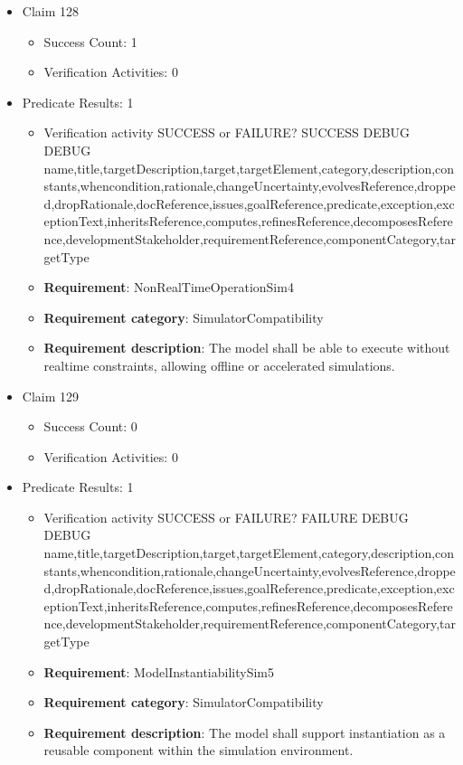 \documentclass{article}
\begin{document}
\begin{itemize}
  				  \item Claim 128
				\begin{itemize}
			    	\item Success Count: 1 
			    	\item Verification Activities: 0
				\end{itemize}
				
									    
				\item Predicate Results: 1
					\begin{itemize}				
					\item Verification activity SUCCESS or FAILURE? SUCCESS
					DEBUG DEBUG name,title,targetDescription,target,targetElement,category,description,constants,whencondition,rationale,changeUncertainty,evolvesReference,dropped,dropRationale,docReference,issues,goalReference,predicate,exception,exceptionText,inheritsReference,computes,refinesReference,decomposesReference,developmentStakeholder,requirementReference,componentCategory,targetType
					\item \textbf{Requirement}: NonRealTimeOperationSim4 
					\item \textbf{Requirement category}: SimulatorCompatibility
					\item \textbf{Requirement description}: The model shall be able to execute without realtime constraints, allowing offline or accelerated simulations.
					\end{itemize}

  				  \item Claim 129
				\begin{itemize}
			    	\item Success Count: 0 
			    	\item Verification Activities: 0
				\end{itemize}
				
									    
				\item Predicate Results: 1
					\begin{itemize}				
					\item Verification activity SUCCESS or FAILURE? FAILURE
					DEBUG DEBUG name,title,targetDescription,target,targetElement,category,description,constants,whencondition,rationale,changeUncertainty,evolvesReference,dropped,dropRationale,docReference,issues,goalReference,predicate,exception,exceptionText,inheritsReference,computes,refinesReference,decomposesReference,developmentStakeholder,requirementReference,componentCategory,targetType
					\item \textbf{Requirement}: ModelInstantiabilitySim5 
					\item \textbf{Requirement category}: SimulatorCompatibility
					\item \textbf{Requirement description}: The model shall support instantiation as a reusable component within the simulation environment.
					\end{itemize}


\end{itemize}
\end{document}
